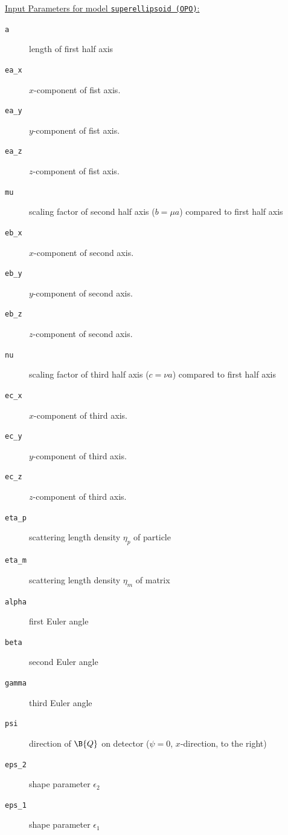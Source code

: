\uline{Input Parameters for model \texttt{superellipsoid (OPO)}:}
\begin{description}
\item[\texttt{a}] length of first half axis
\item[\texttt{ea\_x}] $x$-component of fist axis.
\item[\texttt{ea\_y}] $y$-component of fist axis.
\item[\texttt{ea\_z}] $z$-component of fist axis.
\item[\texttt{mu}] scaling factor of second half axis ($b=\mu a$) compared to first half axis
\item[\texttt{eb\_x}] $x$-component of second axis.
\item[\texttt{eb\_y}] $y$-component of second axis.
\item[\texttt{eb\_z}] $z$-component of second axis.
\item[\texttt{nu}] scaling factor of third half axis ($c=\nu a$) compared to first half axis
\item[\texttt{ec\_x}] $x$-component of third axis.
\item[\texttt{ec\_y}] $y$-component of third axis.
\item[\texttt{ec\_z}] $z$-component of third axis.
\item[\texttt{eta\_p}] scattering length density $\eta_p$ of particle
\item[\texttt{eta\_m}] scattering length density $\eta_m$ of matrix
\item[\texttt{alpha}] first Euler angle
\item[\texttt{beta}] second Euler angle
\item[\texttt{gamma}] third Euler angle
\item[\texttt{psi}] direction of $\B{Q}$ on detector ($\psi=0$, $x$-direction, to the right)
\item[\texttt{eps\_2}] shape parameter $\epsilon_2$
\item[\texttt{eps\_1}] shape parameter $\epsilon_1$
\end{description}


